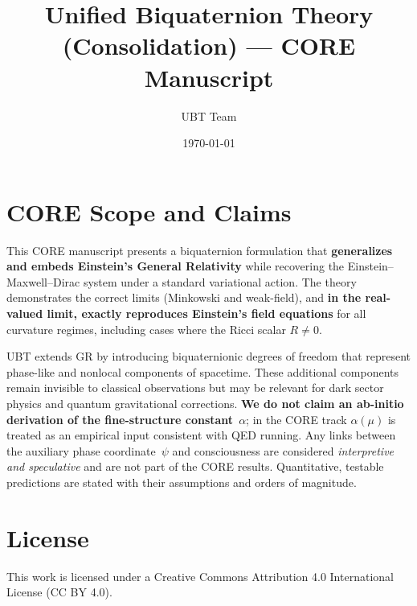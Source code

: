 \documentclass[11pt,a4paper]{article}
\title{Unified Biquaternion Theory (Consolidation) --- CORE Manuscript}
\author{UBT Team}
\date{\today}
\begin{document}
\maketitle

\appendix
\tableofcontents

\section*{CORE Scope and Claims}
This CORE manuscript presents a biquaternion formulation that \textbf{generalizes and embeds Einstein's General Relativity} while recovering the Einstein--Maxwell--Dirac system under a standard variational action. The theory demonstrates the correct limits (Minkowski and weak-field), and \textbf{in the real-valued limit, exactly reproduces Einstein's field equations} for all curvature regimes, including cases where the Ricci scalar $R \neq 0$.

UBT extends GR by introducing biquaternionic degrees of freedom that represent phase-like and nonlocal components of spacetime. These additional components remain invisible to classical observations but may be relevant for dark sector physics and quantum gravitational corrections. \textbf{We do not claim an ab-initio derivation of the fine-structure constant}~$\alpha$; in the CORE track $\alpha(\mu)$ is treated as an empirical input consistent with QED running. Any links between the auxiliary phase coordinate~$\psi$ and consciousness are considered \emph{interpretive and speculative} and are not part of the CORE results. Quantitative, testable predictions are stated with their assumptions and orders of magnitude.













\section*{License}
This work is licensed under a Creative Commons Attribution 4.0 International License (CC BY 4.0).
\end{document}
